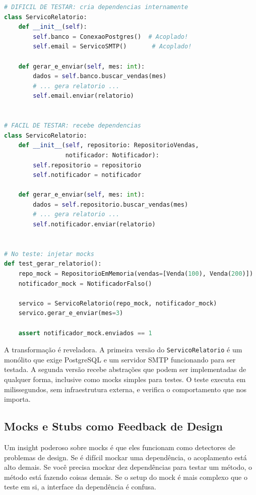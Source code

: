 \begin{lstlisting}[language=Python, caption={Injeção de Dependência para testabilidade}]
# DIFICIL DE TESTAR: cria dependencias internamente
class ServicoRelatorio:
    def __init__(self):
        self.banco = ConexaoPostgres()  # Acoplado!
        self.email = ServicoSMTP()       # Acoplado!

    def gerar_e_enviar(self, mes: int):
        dados = self.banco.buscar_vendas(mes)
        # ... gera relatorio ...
        self.email.enviar(relatorio)


# FACIL DE TESTAR: recebe dependencias
class ServicoRelatorio:
    def __init__(self, repositorio: RepositorioVendas,
                 notificador: Notificador):
        self.repositorio = repositorio
        self.notificador = notificador

    def gerar_e_enviar(self, mes: int):
        dados = self.repositorio.buscar_vendas(mes)
        # ... gera relatorio ...
        self.notificador.enviar(relatorio)


# No teste: injetar mocks
def test_gerar_relatorio():
    repo_mock = RepositorioEmMemoria(vendas=[Venda(100), Venda(200)])
    notificador_mock = NotificadorFalso()

    servico = ServicoRelatorio(repo_mock, notificador_mock)
    servico.gerar_e_enviar(mes=3)

    assert notificador_mock.enviados == 1
\end{lstlisting}

A transformação é reveladora. A primeira versão do \texttt{ServicoRelatorio}
é um monólito que exige PostgreSQL e um servidor SMTP funcionando para ser
testada. A segunda versão recebe abstrações que podem ser implementadas de
qualquer forma, inclusive como mocks simples para testes. O teste executa
em milissegundos, sem infraestrutura externa, e verifica o
comportamento que nos importa.

\subsection{Mocks e Stubs como Feedback de Design}

Um insight poderoso sobre mocks é que eles funcionam como detectores de
problemas de design. Se é difícil mockar uma dependência, o acoplamento
está alto demais. Se você precisa mockar dez dependências para testar um
método, o método está fazendo coisas demais. Se o setup do mock é mais
complexo que o teste em si, a interface da dependência é confusa.

